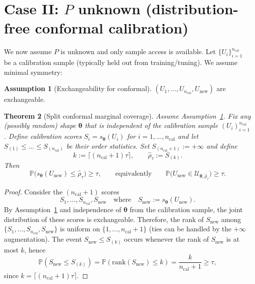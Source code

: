 \documentclass[11pt]{article}
\newcommand{\Prob}{\mathbb{P}}
\newcommand{\cU}{\mathcal{U}}
\newcommand{\btheta}{\bm{\theta}}
\theoremstyle{plain}
\newtheorem{theorem}{Theorem}
\theoremstyle{definition}
\newtheorem{assumption}[theorem]{Assumption}
\begin{document}
\section{Case II: $P$ unknown (distribution-free conformal calibration)}

We now assume $P$ is unknown and only sample access is available.
Let $\{U_i\}_{i=1}^{n_{\mathrm{cal}}}$ be a calibration sample (typically held out from training/tuning).
We assume minimal symmetry:

\begin{assumption}[Exchangeability for conformal]\label{asm:exchange}
$(U_1,\dots,U_{n_{\mathrm{cal}}},U_{\mathrm{new}})$ are exchangeable.
\end{assumption}

\begin{theorem}[Split conformal marginal coverage]\label{thm:conformal}
Assume Assumption~\ref{asm:exchange}. Fix any (possibly random) shape $\btheta$ that is independent of the calibration sample $(U_i)_{i=1}^{n_{\mathrm{cal}}}$.
Define calibration scores $S_i=s_{\btheta}(U_i)$ for $i=1,\dots,n_{\mathrm{cal}}$ and let
$S_{(1)}\le \dots\le S_{(n_{\mathrm{cal}})}$ be their order statistics.
Set $S_{(n_{\mathrm{cal}}+1)}:=+\infty$ and define
\begin{equation}\label{eq:conformal-rho}
k:=\lceil (n_{\mathrm{cal}}+1)\tau\rceil,\qquad
\hat\rho_{\tau}:=S_{(k)}.
\end{equation}
Then
\[
\Prob\big(s_{\btheta}(U_{\mathrm{new}})\le \hat\rho_\tau\big)\ge \tau,
\qquad\text{equivalently}\qquad
\Prob\big(U_{\mathrm{new}}\in \cU_{\btheta,\hat\rho_\tau}\big)\ge \tau.
\]
\end{theorem}

\begin{proof}
Consider the $(n_{\mathrm{cal}}+1)$ scores
\[
S_1,\dots,S_{n_{\mathrm{cal}}},S_{\mathrm{new}}
\quad\text{where}\quad
S_{\mathrm{new}}:=s_{\btheta}(U_{\mathrm{new}}).
\]
By Assumption~\ref{asm:exchange} and independence of $\btheta$ from the calibration sample,
the joint distribution of these scores is exchangeable.
Therefore, the rank of $S_{\mathrm{new}}$ among $\{S_1,\dots,S_{n_{\mathrm{cal}}},S_{\mathrm{new}}\}$ is uniform on $\{1,\dots,n_{\mathrm{cal}}+1\}$ (ties can be handled by the $+\infty$ augmentation).
The event $S_{\mathrm{new}}\le S_{(k)}$ occurs whenever the rank of $S_{\mathrm{new}}$ is at most $k$, hence
\[
\Prob(S_{\mathrm{new}}\le S_{(k)})
=
\Prob(\mathrm{rank}(S_{\mathrm{new}})\le k)
=
\frac{k}{n_{\mathrm{cal}}+1}
\ge \tau,
\]
since $k=\lceil (n_{\mathrm{cal}}+1)\tau\rceil$.
\end{proof}
\end{document}
